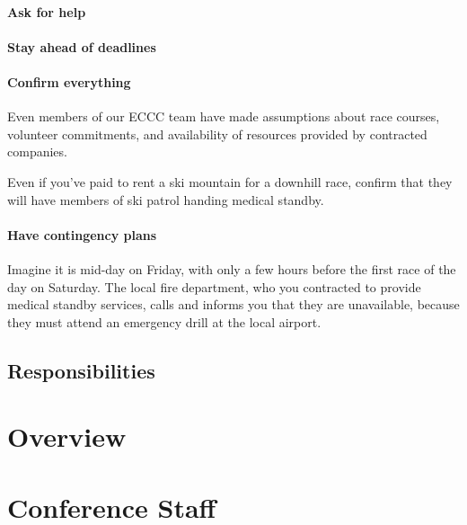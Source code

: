 \documentclass[
  letterpaper, %
  fontsize=10pt, %
  twoside=true,
  chapterentrydots=true, %
  numbers=noenddot,
  fontmethod=tex,
]{kaobook}
\begin{document}
\subsubsection{Ask for help}

\subsubsection{Stay ahead of deadlines}

\subsubsection{Confirm everything}

Even members of our ECCC team have made assumptions about
race courses, volunteer commitments, and availability of resources provided by contracted companies.

Even if you've paid to rent a ski mountain for a downhill race,
confirm that they will have members of ski patrol handing medical standby.

\subsubsection{Have contingency plans}

Imagine it is mid-day on Friday, with only a few hours before the first race of the day on Saturday.
The local fire department, who you contracted to provide medical standby services,
calls and informs you that they are unavailable, because they must attend an emergency drill at the local airport.

\section{Responsibilities}


\setchapterpreamble[u]{\margintoc}
\chapter{Overview}


\setchapterpreamble[u]{\margintoc}
\chapter{Conference Staff}
\end{document}
